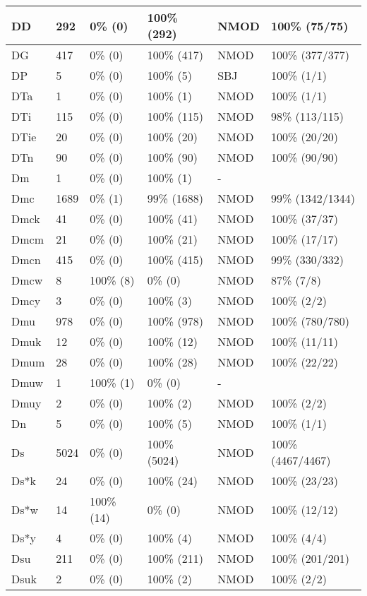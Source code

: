 \begin{figure*}
\begin{tabular}{|l|l|l|l||l|l|}
\hline
 DD & 292 & 0\% (0) & 100\% (292) & NMOD & 100\% (75/75) \\ 
\hline
 DG & 417 & 0\% (0) & 100\% (417) & NMOD & 100\% (377/377) \\ 
\hline
 DP & 5 & 0\% (0) & 100\% (5) & SBJ & 100\% (1/1) \\ 
\hline
 DTa & 1 & 0\% (0) & 100\% (1) & NMOD & 100\% (1/1) \\ 
\hline
 DTi & 115 & 0\% (0) & 100\% (115) & NMOD & 98\% (113/115) \\ 
\hline
 DTie & 20 & 0\% (0) & 100\% (20) & NMOD & 100\% (20/20) \\ 
\hline
 DTn & 90 & 0\% (0) & 100\% (90) & NMOD & 100\% (90/90) \\ 
\hline
 Dm & 1 & 0\% (0) & 100\% (1) & - &  \\ 
\hline
 Dmc & 1689 & 0\% (1) & 99\% (1688) & NMOD & 99\% (1342/1344) \\ 
\hline
 Dmck & 41 & 0\% (0) & 100\% (41) & NMOD & 100\% (37/37) \\ 
\hline
 Dmcm & 21 & 0\% (0) & 100\% (21) & NMOD & 100\% (17/17) \\ 
\hline
 Dmcn & 415 & 0\% (0) & 100\% (415) & NMOD & 99\% (330/332) \\ 
\hline
 Dmcw & 8 & 100\% (8) & 0\% (0) & NMOD & 87\% (7/8) \\ 
\hline
 Dmcy & 3 & 0\% (0) & 100\% (3) & NMOD & 100\% (2/2) \\ 
\hline
 Dmu & 978 & 0\% (0) & 100\% (978) & NMOD & 100\% (780/780) \\ 
\hline
 Dmuk & 12 & 0\% (0) & 100\% (12) & NMOD & 100\% (11/11) \\ 
\hline
 Dmum & 28 & 0\% (0) & 100\% (28) & NMOD & 100\% (22/22) \\ 
\hline
 Dmuw & 1 & 100\% (1) & 0\% (0) & - &  \\ 
\hline
 Dmuy & 2 & 0\% (0) & 100\% (2) & NMOD & 100\% (2/2) \\ 
\hline
 Dn & 5 & 0\% (0) & 100\% (5) & NMOD & 100\% (1/1) \\ 
\hline
 Ds & 5024 & 0\% (0) & 100\% (5024) & NMOD & 100\% (4467/4467) \\ 
\hline
 Ds*k & 24 & 0\% (0) & 100\% (24) & NMOD & 100\% (23/23) \\ 
\hline
 Ds*w & 14 & 100\% (14) & 0\% (0) & NMOD & 100\% (12/12) \\ 
\hline
 Ds*y & 4 & 0\% (0) & 100\% (4) & NMOD & 100\% (4/4) \\ 
\hline
 Dsu & 211 & 0\% (0) & 100\% (211) & NMOD & 100\% (201/201) \\ 
\hline
 Dsuk & 2 & 0\% (0) & 100\% (2) & NMOD & 100\% (2/2) \\ 
\hline
\end{tabular}
\end{figure*}
